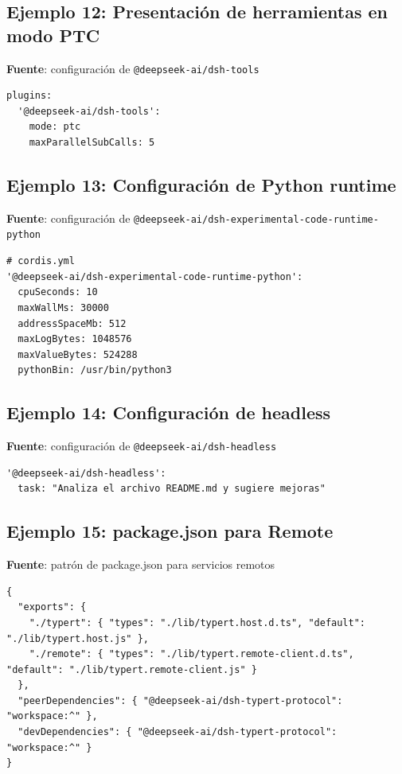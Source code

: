 \documentclass[11pt,a4paper]{article}
\begin{document}
\subsection*{Ejemplo 12: Presentación de herramientas en modo PTC}


\textbf{Fuente}: configuración de \texttt{@deepseek-ai/dsh-tools}


\begin{lstlisting}
plugins:
  '@deepseek-ai/dsh-tools':
    mode: ptc
    maxParallelSubCalls: 5
\end{lstlisting}


\subsection*{Ejemplo 13: Configuración de Python runtime}


\textbf{Fuente}: configuración de \texttt{@deepseek-ai/dsh-experimental-code-runtime-python}


\begin{lstlisting}
# cordis.yml
'@deepseek-ai/dsh-experimental-code-runtime-python':
  cpuSeconds: 10
  maxWallMs: 30000
  addressSpaceMb: 512
  maxLogBytes: 1048576
  maxValueBytes: 524288
  pythonBin: /usr/bin/python3
\end{lstlisting}


\subsection*{Ejemplo 14: Configuración de headless}


\textbf{Fuente}: configuración de \texttt{@deepseek-ai/dsh-headless}


\begin{lstlisting}
'@deepseek-ai/dsh-headless':
  task: "Analiza el archivo README.md y sugiere mejoras"
\end{lstlisting}


\subsection*{Ejemplo 15: package.json para Remote}


\textbf{Fuente}: patrón de package.json para servicios remotos


\begin{lstlisting}
{
  "exports": {
    "./typert": { "types": "./lib/typert.host.d.ts", "default": "./lib/typert.host.js" },
    "./remote": { "types": "./lib/typert.remote-client.d.ts", "default": "./lib/typert.remote-client.js" }
  },
  "peerDependencies": { "@deepseek-ai/dsh-typert-protocol": "workspace:^" },
  "devDependencies": { "@deepseek-ai/dsh-typert-protocol": "workspace:^" }
}
\end{lstlisting}
\end{document}
